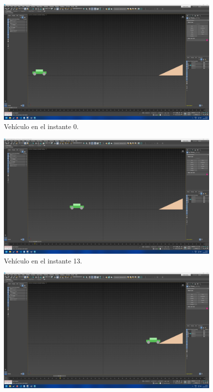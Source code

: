 \documentclass{article}
\begin{document}
{%
\begin{figure}[H]
    \centering
    \includegraphics[width=\textwidth]{imagenes/Ejercicio2/keyframes/0.png}
    \caption{Vehículo en el instante 0.}
 \end{figure}
 \begin{figure}[H]
    \centering
    \includegraphics[width=\textwidth]{imagenes/Ejercicio2/keyframes/13.png}
    \caption{Vehículo en el instante 13.}
 \end{figure}
 \begin{figure}[H]
    \centering
    \includegraphics[width=\textwidth]{imagenes/Ejercicio2/keyframes/26.png}

\end{figure}}
\end{document}
